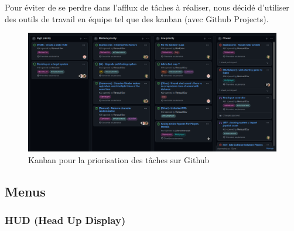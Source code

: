 \documentclass[french, 12pt]{article}
\begin{document}
    Pour éviter de se perdre dans l'afflux de tâches à réaliser, nous décidé d'utiliser des
    outils de travail en équipe tel que des kanban (avec Github Projects).\\
    

    \begin{figure}[hbt!]
        \centering
        \includegraphics[scale=0.28]{kanban.png}
        \caption{Kanban pour la priorisation des tâches sur Github}
    \end{figure}


    
    
    \newpage

    



    


    
    \subsection{Menus}

        \subsubsection{HUD (Head Up Display)}
\end{document}
